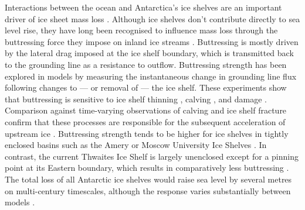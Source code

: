 Interactions between the ocean and Antarctica's ice shelves are an important driver of ice sheet mass loss \citep{seroussiISMIP6AntarcticaMultimodel2020,coulonDisentanglingDriversFuture2024}. Although ice shelves don't contribute directly to sea level rise, they have long been recognised to influence mass loss through the buttressing force they impose on inland ice streams \citep{dupontAssessmentImportanceIceshelf2005}. Buttressing is mostly driven by the lateral drag imposed at the ice shelf boundary, which is transmitted back to the grounding line as a resistance to outflow. Buttressing strength has been explored in models by measuring the instantaneous change in grounding line flux following changes to --- or removal of --- the ice shelf. These experiments show that buttressing is sensitive to ice shelf thinning \citep{reeseFarReachIceshelf2018,gudmundssonInstantaneousAntarcticIce2019,greeneAntarcticCalvingLoss2022}, calving \citep{greeneAntarcticCalvingLoss2022}, and damage \citep{lhermitteDamageAcceleratesIce2020}. Comparison against time-varying observations of calving and ice shelf fracture confirm that these processes are responsible for the subsequent acceleration of upstream ice \citep{sunSpeedupPineIsland2023,surawy-stepneyEpisodicDynamicChange2023}. Buttressing strength tends to be higher for ice shelves in tightly enclosed basins such as the Amery or Moscow University Ice Shelves \citep{greeneAntarcticCalvingLoss2022}. In contrast, the current Thwaites Ice Shelf is largely unenclosed except for a pinning point at its Eastern boundary, which results in comparatively less buttressing \citep{greeneAntarcticCalvingLoss2022,gudmundssonLimitedImpactThwaites2023}. The total loss of all Antarctic ice shelves would raise sea level by several metres on multi-century timescales, although the response varies substantially between models \citep{sunAntarcticIceSheet2020}.

